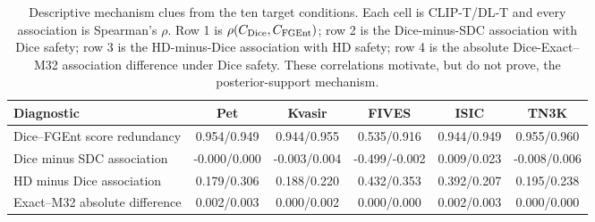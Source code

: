 \begin{table}[h!]
\centering
\scriptsize
\setlength{\tabcolsep}{4pt}
\caption{Descriptive mechanism clues from the ten target conditions. Each cell is CLIP-T/DL-T and every association is Spearman's $\rho$. Row 1 is $\rho(C_{\rm Dice},C_{\rm FGEnt})$; row 2 is the Dice-minus-SDC association with Dice safety; row 3 is the HD-minus-Dice association with HD safety; row 4 is the absolute Dice-Exact--M32 association difference under Dice safety. These correlations motivate, but do not prove, the posterior-support mechanism.}
\label{tab:mechanism-clues}
\begin{tabular}{lccccc}
\toprule
Diagnostic & Pet & Kvasir & FIVES & ISIC & TN3K \\
\midrule
Dice--FGEnt score redundancy & 0.954/0.949 & 0.944/0.955 & 0.535/0.916 & 0.944/0.949 & 0.955/0.960 \\
Dice minus SDC association & -0.000/0.000 & -0.003/0.004 & -0.499/-0.002 & 0.009/0.023 & -0.008/0.006 \\
HD minus Dice association & 0.179/0.306 & 0.188/0.220 & 0.432/0.353 & 0.392/0.207 & 0.195/0.238 \\
Exact--M32 absolute difference & 0.002/0.003 & 0.000/0.002 & 0.000/0.000 & 0.002/0.003 & 0.000/0.000 \\
\bottomrule
\end{tabular}
\end{table}
